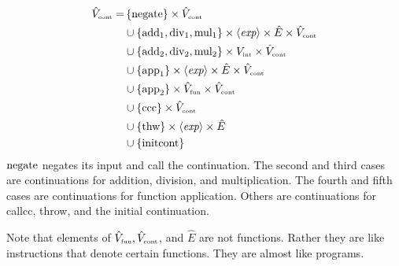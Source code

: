 \begin{enumcirc}
	\begin{align*}
		\hat{V}_{\textrm{\tiny cont}} = & \left\{ \textrm{negate} \right\} \times \hat{V}_{\textrm{\tiny cont}}                                                            \\
		                            & \cup \left\{ \textrm{add}_1, \textrm{div}_1, \textrm{mul}_1 \right\} \times \left\langle \textit{exp} \right\rangle \times \hat{E} \times \hat{V}_{\textrm{\tiny cont}} \\
		                            & \cup \left\{ \textrm{add}_2, \textrm{div}_2, \textrm{mul}_2 \right\} \times V_{\textrm{\tiny int}} \times \hat{V}_{\textrm{\tiny cont}}        \\
		                            & \cup \left\{ \textrm{app}_1 \right\} \times \left\langle \textit{exp} \right\rangle \times \hat{E} \times \hat{V}_{\textrm{\tiny cont}}                     \\
		                            & \cup \left\{ \textrm{app}_2 \right\} \times \hat{V}_{\textrm{\tiny fun}} \times \hat{V}_{\textrm{\tiny cont}}                      \\
		                            & \cup \left\{ \textrm{ccc} \right\} \times \hat{V}_{\textrm{\tiny cont}}                                                          \\
		                            & \cup \left\{ \textrm{thw} \right\} \times \left\langle \textit{exp} \right\rangle \times \hat{E}                                                          \\
		                            & \cup \left\{ \textrm{initcont} \right\}
	\end{align*}
	$\textrm{negate}$ negates its input and call the continuation.
	The second and third cases are continuations for addition, division, and
	multiplication.
	The fourth and fifth cases are continuations for function application.
	Others are continuations for callcc, throw, and the initial continuation.

	Note that elements of $\hat{V}_{\textrm{\tiny fun}}, \hat{V}_{\textrm{\tiny cont}}$,
	and $\hat{E}$ are not functions.
	Rather they are like instructions that denote certain functions.
	They are almost like programs.


\end{enumcirc}
